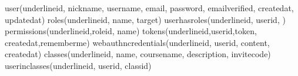 {}\markdownRendererInterblockSeparator
{}\markdownRendererInterblockSeparator
{}\markdownRendererInterblockSeparator
{}\markdownRendererInterblockSeparator
{}\markdownRendererUlBeginTight
\markdownRendererUlItem user(\markdownRendererBackslash{}underline\markdownRendererLeftBrace{}id\markdownRendererRightBrace{}, nickname, username, email, password, email\markdownRendererBackslash{}\markdownRendererUnderscore{}verified, created\markdownRendererBackslash{}\markdownRendererUnderscore{}at, updated\markdownRendererBackslash{}\markdownRendererUnderscore{}at)\markdownRendererUlItemEnd 
\markdownRendererUlItem roles(\markdownRendererBackslash{}underline\markdownRendererLeftBrace{}id\markdownRendererRightBrace{}, name, target)\markdownRendererUlItemEnd 
\markdownRendererUlItem user\markdownRendererBackslash{}\markdownRendererUnderscore{}has\markdownRendererBackslash{}\markdownRendererUnderscore{}roles(\markdownRendererBackslash{}underline\markdownRendererLeftBrace{}id\markdownRendererRightBrace{}, user\markdownRendererBackslash{}\markdownRendererUnderscore{}id, )\markdownRendererUlItemEnd 
\markdownRendererUlItem permissions(\markdownRendererBackslash{}underline\markdownRendererLeftBrace{}id\markdownRendererRightBrace{},role\markdownRendererBackslash{}\markdownRendererUnderscore{}id, name)\markdownRendererUlItemEnd 
\markdownRendererUlItem tokens(\markdownRendererBackslash{}underline\markdownRendererLeftBrace{}id\markdownRendererRightBrace{},user\markdownRendererBackslash{}\markdownRendererUnderscore{}id,token, created\markdownRendererBackslash{}\markdownRendererUnderscore{}at,remember\markdownRendererBackslash{}\markdownRendererUnderscore{}me)\markdownRendererUlItemEnd 
\markdownRendererUlItem webauthn\markdownRendererBackslash{}\markdownRendererUnderscore{}credentials(\markdownRendererBackslash{}underline\markdownRendererLeftBrace{}id\markdownRendererRightBrace{}, user\markdownRendererBackslash{}\markdownRendererUnderscore{}id, content, created\markdownRendererBackslash{}\markdownRendererUnderscore{}at)\markdownRendererUlItemEnd 
\markdownRendererUlItem classes(\markdownRendererBackslash{}underline\markdownRendererLeftBrace{}id\markdownRendererRightBrace{}, name, course\markdownRendererBackslash{}\markdownRendererUnderscore{}name, description, invite\markdownRendererBackslash{}\markdownRendererUnderscore{}code)\markdownRendererUlItemEnd 
\markdownRendererUlItem user\markdownRendererBackslash{}\markdownRendererUnderscore{}in\markdownRendererBackslash{}\markdownRendererUnderscore{}classes(\markdownRendererBackslash{}underline\markdownRendererLeftBrace{}id\markdownRendererRightBrace{}, user\markdownRendererBackslash{}\markdownRendererUnderscore{}id, class\markdownRendererBackslash{}\markdownRendererUnderscore{}id)\markdownRendererUlItemEnd 
